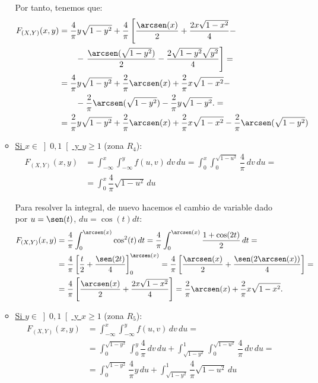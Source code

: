 \documentclass[12pt]{article}
\begin{document}
\begin{ejercicio}
\begin{enumerate}
\begin{itemize}
                Por tanto, tenemos que:
                \begin{align*}
                    F_{(X,Y)}(x, y) &= \dfrac{4}{\pi} y\sqrt{1-y^2} + \dfrac{4}{\pi}\left[\dfrac{\arcsen(x)}{2}+\dfrac{2x\sqrt{1-x^2}}{4}-\right.\\&\qquad -\left.\dfrac{\arcsen(\sqrt{1-y^2})}{2}-\dfrac{2\sqrt{1-y^2}\sqrt{y^2}}{4}\right]
                    =\\&= \dfrac{4}{\pi} y\sqrt{1-y^2} + \dfrac{2}{\pi}\arcsen(x)+\dfrac{2}{\pi}x\sqrt{1-x^2}-\\&\qquad-\dfrac{2}{\pi}\arcsen(\sqrt{1-y^2})-\dfrac{2}{\pi}y\sqrt{1-y^2}.
                    =\\&= \dfrac{2}{\pi} y\sqrt{1-y^2} + \dfrac{2}{\pi}\arcsen(x)+\dfrac{2}{\pi}x\sqrt{1-x^2}-\dfrac{2}{\pi}\arcsen(\sqrt{1-y^2})
                \end{align*}

                \item \ul{Si $x\in \left]0,1\right[$ \quad y \quad $y\geq 1$} (zona $R_4$):
                \begin{align*}
                    F_{(X,Y)}(x, y) &= \int_{-\infty}^x \int_{-\infty}^y f(u, v) \, dv \, du = \int_{0}^x \int_{0}^{\sqrt{1-u^2}} \dfrac{4}{\pi} \, dv \, du
                    =\\&= \int_{0}^x \dfrac{4}{\pi}\sqrt{1-u^2} \, du
                \end{align*}

                Para resolver la integral, de nuevo hacemos el cambio de variable dado por $u=\sen(t)$, $du=\cos(t)dt$:
                \begin{align*}
                    F_{(X,Y)}(x, y) &= \dfrac{4}{\pi}\int_{0}^{\arcsen(x)} \cos^2(t) \, dt
                    = \dfrac{4}{\pi}\int_{0}^{\arcsen(x)} \dfrac{1+\cos(2t)}{2} \, dt
                    =\\&= \dfrac{4}{\pi}\left[\dfrac{t}{2}+\dfrac{\sen(2t)}{4}\right]_0^{\arcsen(x)}
                    = \dfrac{4}{\pi}\left[\dfrac{\arcsen(x)}{2}+\dfrac{\sen(2\arcsen(x))}{4}\right]
                    =\\&= \dfrac{4}{\pi}\left[\dfrac{\arcsen(x)}{2}+\dfrac{2x\sqrt{1-x^2}}{4}\right]
                    = \dfrac{2}{\pi}\arcsen(x)+\dfrac{2}{\pi}x\sqrt{1-x^2}.
                \end{align*}

                \item \ul{Si $y\in \left]0,1\right[$ \quad y \quad $x\geq 1$} (zona $R_5$):
                \begin{align*}
                    F_{(X,Y)}(x, y) &= \int_{-\infty}^x \int_{-\infty}^y f(u, v) \, dv \, du =\\
                    &= \int_{0}^{\sqrt{1-y^2}} \int_{0}^y \dfrac{4}{\pi} \, dv \, du + \int_{\sqrt{1-y^2}}^1 \int_{0}^{\sqrt{1-u^2}} \dfrac{4}{\pi} \, dv \, du
                    =\\&= \int_{0}^{\sqrt{1-y^2}} \dfrac{4}{\pi}y \, du + \int_{\sqrt{1-y^2}}^1 \dfrac{4}{\pi}\sqrt{1-u^2} \, du
                \end{align*}


\end{itemize}
\end{enumerate}
\end{ejercicio}
\end{document}
